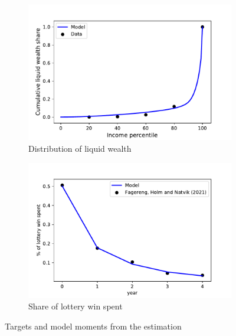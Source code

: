 \begin{figure}[htb]
	\centering
	\begin{subfigure}[b]{.5\linewidth}
		\centering
		\includegraphics[width=\linewidth]{../Code/HA-Models/Target_AggMPCX_LiquWealth/Figures/LiquWealth_Distribution}
		\caption{Distribution of liquid wealth}
		\label{fig:liquwealthdistribution}
	\end{subfigure}%
	\begin{subfigure}[b]{.5\linewidth}
			\centering
		\includegraphics[width=\linewidth]{../Code/HA-Models/Target_AggMPCX_LiquWealth/Figures/AggMPC_LotteryWin}
		\caption{Share of lottery win spent}
		\label{fig:aggmpclotterywin}
	\end{subfigure}
	\caption{Targets and model moments from the estimation}
	\label{fig:splurge_estimation}
\end{figure}


